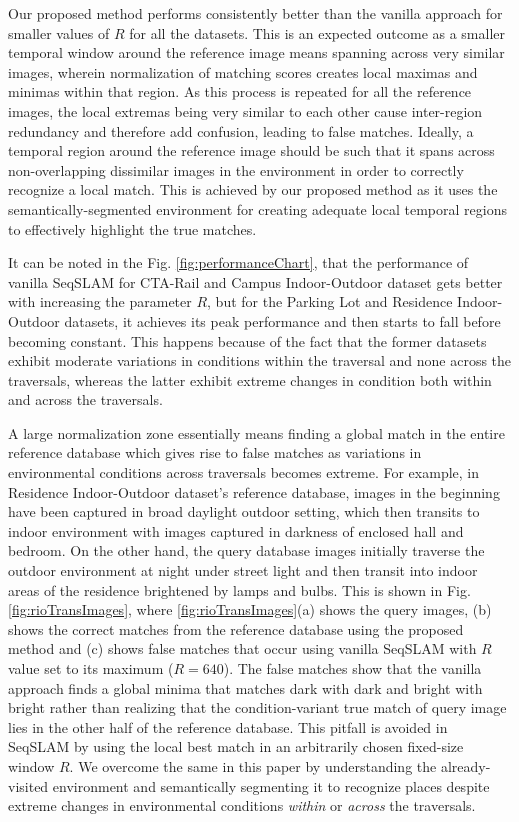 \documentclass[letterpaper, 10 pt, conference]{ieeeconf}  %
\begin{document}
Our proposed method performs consistently better than the vanilla approach for smaller values of $R$ for all the datasets. This is an expected outcome as a smaller temporal window around the reference image means spanning across very similar images, wherein normalization of matching scores creates local maximas and minimas within that region. As this process is repeated for all the reference images, the local extremas being very similar to each other cause inter-region redundancy and therefore add confusion, leading to false matches. Ideally, a temporal region around the reference image should be such that it spans across non-overlapping dissimilar images in the environment in order to correctly recognize a local match. This is achieved by our proposed method as it uses the semantically-segmented environment for creating adequate local temporal regions to effectively highlight the true matches.

It can be noted in the Fig. \ref{fig:performanceChart}, that the performance of vanilla SeqSLAM for CTA-Rail and Campus Indoor-Outdoor dataset gets better with increasing the parameter $R$, but for the Parking Lot and Residence Indoor-Outdoor datasets, it achieves its peak performance and then starts to fall before becoming constant. This happens because of the fact that the former datasets exhibit moderate variations in conditions within the traversal and none across the traversals, whereas the latter exhibit extreme changes in condition both within and across the traversals. 

A large normalization zone essentially means finding a global match in the entire reference database which gives rise to false matches as variations in environmental conditions across traversals becomes extreme. For example, in Residence Indoor-Outdoor dataset's reference database, images in the beginning have been captured in broad daylight outdoor setting, which then transits to indoor environment with images captured in darkness of enclosed hall and bedroom. On the other hand, the query database images initially traverse the outdoor environment at night under street light and then transit into indoor areas of the residence brightened by lamps and bulbs. This is shown in Fig. \ref{fig:rioTransImages}, where \ref{fig:rioTransImages}(a) shows the query images, (b) shows the correct matches from the reference database using the proposed method and (c) shows false matches that occur using vanilla SeqSLAM with $R$ value set to its maximum ($R=640$). The false matches show that the vanilla approach finds a global minima that matches dark with dark and bright with bright rather than realizing that the condition-variant true match of query image lies in the other half of the reference database. This pitfall is avoided in SeqSLAM by using the local best match in an arbitrarily chosen fixed-size window $R$. We overcome the same in this paper by understanding the already-visited environment and semantically segmenting it to recognize places despite extreme changes in environmental conditions \emph{within} or \emph{across} the traversals.
\end{document}
